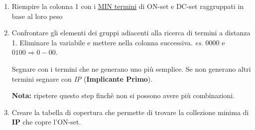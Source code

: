 \documentclass[../main.tex]{subfiles}
\begin{document}
\vspace{0.2cm}
\begin{enumerate}
    \item Riempire la colonna 1 con i \underline{MIN termini} di ON-set e DC-set raggruppati in base al loro peso
    \item Confrontare gli elementi dei gruppi adiacenti alla ricerca di termini a distanza 1. Eliminare la variabile e mettere nella
    colonna successiva. \textit{es.} $0000$ e $0100 \Rightarrow 0-00$. 

    Segnare con \checkmark i termini che ne generano uno più semplice. Se non generano altri termini segnare con \textit{IP} (\textbf{Implicante Primo}).
    
    \textbf{Nota:} ripetere questo step finchè non si possono avere più combinazioni.
    \item Creare la tabella di copertura che permette di trovare la collezione minima di \textbf{IP} che copre l'ON-set.
\end{enumerate}
\end{document}

